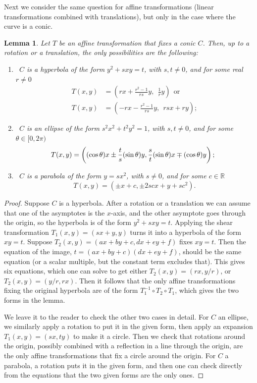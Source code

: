 \documentclass[12pt]{article}
\newtheorem{lemma}[theorem]{Lemma}
\begin{document}
Next we consider the same question for affine transformations (linear transformations combined with translations),
but only in the case where the curve is a conic.

  \begin{lemma}\label{lem:affine}
    Let $T$ be an affine transformation that fixes a conic $C$.
    Then, up to a rotation or a translation, the only possibilities are the following:
    \begin{enumerate}
     \item[(1)] ~$C$ is a hyperbola of the form $y^2 + sxy=t$, with $s,t\neq 0$, and for some real $r\neq 0$
     \begin{align*}
     T(x,y) &= \left(rx+\frac{r^2-1}{rs} y, ~~\frac{1}{r}y\right)
     ~~\text{or}\\
     T(x,y) &= \left(-rx-\frac{r^2-1}{rs} y, ~~rsx + ry\right);
     \end{align*}
     \item[(2)] ~$C$ is an ellipse of the form $s^2x^2 + t^2y^2 = 1$, with $s,t\neq 0$,  and 
     for some $\theta\in [0,2\pi)$
     $$\hspace{-5pt}T(x,y) = \left((\cos\theta)x \pm \frac{t}{s} (\sin\theta)y, 
                      \frac{s}{t}(\sin\theta)x \mp(\cos\theta) y\right);$$
     \item[(3)] ~$C$ is a parabola of the form $y = s x^2$, with $s\neq 0$, and for some $c\in \mathbb{R}$
     $$T(x,y) = (\pm x+c,\pm 2sc x + y + sc^2).$$
    \end{enumerate}
   \end{lemma}
   \begin{proof}
    Suppose $C$ is a hyperbola.
    After a rotation or a translation we can assume that one of the asymptotes is the $x$-axis,
    and the other asymptote goes through the origin,
    so the hyperbola is of the form $y^2 + sxy=t$.
    Applying the shear transformation $T_1(x,y) = (sx+y, y)$ turns it into
    a hyperbola of the form $xy=t$. 
    Suppose $T_2(x,y) = (ax+by+c, dx+ey+f)$ fixes $xy = t$. 
    Then the equation of the image, 
    $t = (ax+by+c)(dx+ey+f)$,
    should be the same equation 
    (or a scalar multiple, but the constant term excludes that).
    This gives six equations, which one can solve
    to get either $T_2(x,y) = (rx, y/r)$, or $T_2(x,y) = (y/r,rx)$. 
    Then it follows that the only affine transformations fixing the original hyperbola
    are of the form $T_1^{-1}\circ T_2\circ T_1$,
    which gives the two forms in the lemma.
    
    
    We leave it to the reader to check the other two cases in detail.
    For $C$ an ellipse, we similarly apply a rotation to put it in the given form,
    then apply an expansion $T_1(x,y) = (sx,ty)$ to make it a circle.
    Then we check that rotations around the origin,
    possibly combined with a reflection in a line through the origin, 
    are the only affine transformations 
    that fix a circle around the origin. 
    For $C$ a parabola, a rotation puts it in the given form, 
    and then one can check directly from the equations 
    that the two given forms are the only ones.
   \end{proof}
\end{document}
